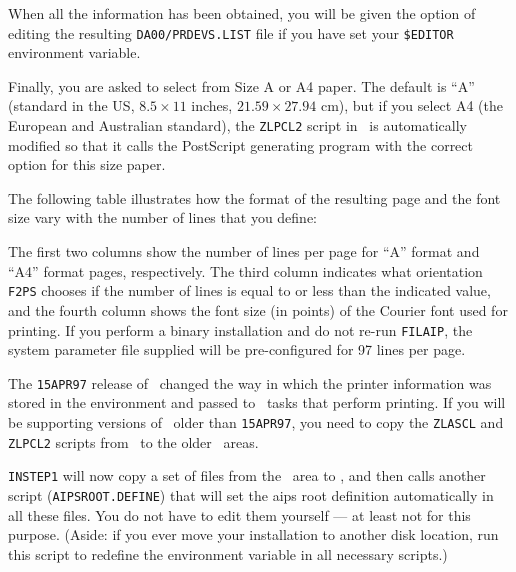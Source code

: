 \noindent When all the information has been obtained, you will be given
the option of editing the resulting {\tt DA00/PRDEVS.LIST} file if you
have set your {\tt\$EDITOR}
environment variable.

Finally, you are asked to select from Size A or A4 paper.  The default
is ``A'' (standard in the US, $8.5 \times 11$ inches, $21.59 \times
27.94$ cm), but if you select A4 (the European and Australian standard),
the {\tt ZLPCL2} script in \SYSU\ is automatically modified so that it
calls the PostScript generating program with the correct option for this
size paper.

The following table illustrates how the format of the resulting page
and the font size vary with the number of lines that you define:\medskip

\medskip

The first two columns show the number of lines per page for ``A'' format
and ``A4'' format pages, respectively.  The third column indicates what
orientation {\tt F2PS} chooses if the number of lines is equal to or
less than the indicated value, and the fourth column shows the font size
(in points) of the Courier font used for printing.  If you perform a
binary installation and do not re-run {\tt FILAIP}, the system parameter
file supplied will be pre-configured for 97 lines per page.

The {\tt 15APR97} release of \AIPS\ changed the way in which the printer
information was stored in the environment and passed to \ttaips\ tasks
that perform printing.  If you will be supporting versions of \AIPS\
older than {\tt 15APR97}, you need to copy the {\tt ZLASCL} and {\tt
ZLPCL2} scripts from \THISVER\ to the older \SYSU\ areas.

\medskip{}

{\tt INSTEP1} will now copy a set of files from the \SYSU\ area to
\AROOT, and then calls another script ({\tt AIPSROOT.DEFINE}) that will
set the aips root definition automatically in all these files.  You do
not have to edit them yourself --- at least not for this purpose.
(Aside: if you ever move your installation to another disk location, run
this script to redefine the {\tt\AROOT} environment variable in all
necessary scripts.)

